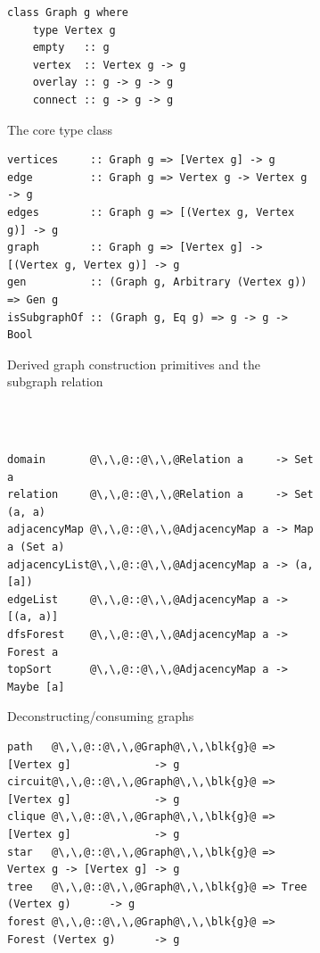 \begin{figure}
\begin{subfigure}[b]{0.27\linewidth}
\begin{verbatim}
class Graph g where
    type Vertex g
    empty   :: g
    vertex  :: Vertex g -> g
    overlay :: g -> g -> g
    connect :: g -> g -> g
\end{verbatim}
\caption{The core type class}
\end{subfigure}
\hfill
\hfill
\vrule
\hfill
\hfill
\begin{subfigure}[b]{0.68\linewidth}
\begin{verbatim}
vertices     :: Graph g => [Vertex g] -> g
edge         :: Graph g => Vertex g -> Vertex g -> g
edges        :: Graph g => [(Vertex g, Vertex g)] -> g
graph        :: Graph g => [Vertex g] -> [(Vertex g, Vertex g)] -> g
gen          :: (Graph g, Arbitrary (Vertex g)) => Gen g
isSubgraphOf :: (Graph g, Eq g) => g -> g -> Bool
\end{verbatim}
\caption{Derived graph construction primitives and the subgraph relation}
\end{subfigure}
~\\
~\\
\begin{subfigure}[b]{0.49\linewidth}
\begin{verbatim}
domain       @\,\,@::@\,\,@Relation a     -> Set a
relation     @\,\,@::@\,\,@Relation a     -> Set (a, a)
adjacencyMap @\,\,@::@\,\,@AdjacencyMap a -> Map a (Set a)
adjacencyList@\,\,@::@\,\,@AdjacencyMap a -> (a, [a])
edgeList     @\,\,@::@\,\,@AdjacencyMap a -> [(a, a)]
dfsForest    @\,\,@::@\,\,@AdjacencyMap a -> Forest a
topSort      @\,\,@::@\,\,@AdjacencyMap a -> Maybe [a]
\end{verbatim}
\caption{Deconstructing/consuming graphs}
\end{subfigure}
\hfill
\hfill
\vrule
\hfill
\hfill
\begin{subfigure}[b]{0.47\linewidth}
\begin{verbatim}
path   @\,\,@::@\,\,@Graph@\,\,\blk{g}@ => [Vertex g]             -> g
circuit@\,\,@::@\,\,@Graph@\,\,\blk{g}@ => [Vertex g]             -> g
clique @\,\,@::@\,\,@Graph@\,\,\blk{g}@ => [Vertex g]             -> g
star   @\,\,@::@\,\,@Graph@\,\,\blk{g}@ => Vertex g -> [Vertex g] -> g
tree   @\,\,@::@\,\,@Graph@\,\,\blk{g}@ => Tree   (Vertex g)      -> g
forest @\,\,@::@\,\,@Graph@\,\,\blk{g}@ => Forest (Vertex g)      -> g

\end{verbatim}
\end{subfigure}
\end{figure}
